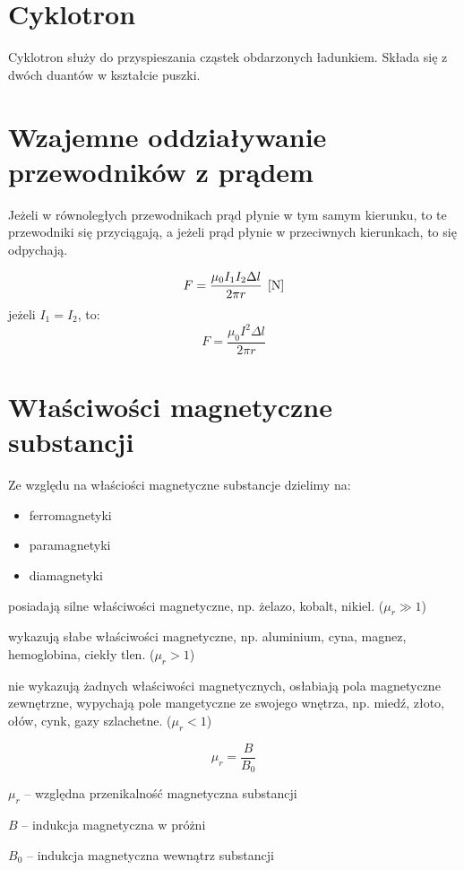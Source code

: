   \section{Cyklotron}
    Cyklotron służy do przyspieszania cząstek obdarzonych ładunkiem. Składa się z dwóch duantów w kształcie puszki.

  \section{Wzajemne oddziaływanie przewodników z prądem}
    Jeżeli w równoległych przewodnikach prąd płynie w tym samym kierunku, to te przewodniki się przyciągają, a jeżeli prąd płynie w przeciwnych kierunkach, to się odpychają.
    \begin{center}
      \begin{tikzpicture}
      \end{tikzpicture}
    \end{center}
    \begin{equation*}
      F = \frac{\mu_0I_1I_2\Delta l}{2\pi r} \unit N
    \end{equation*}
    jeżeli $I_1 = I_2$, to:
    \begin{equation*}
      F = \frac{\mu_0I^2\Delta l}{2\pi r}
    \end{equation*}

  \section{Właściwości magnetyczne substancji}
    Ze względu na właściości magnetyczne substancje dzielimy na:
    \begin{itemize}
      \item ferromagnetyki
      \item paramagnetyki
      \item diamagnetyki
    \end{itemize}


     posiadają silne właściwości magnetyczne, np. żelazo, kobalt, nikiel. ($\mu_r \gg 1$)

     wykazują słabe właściwości magnetyczne, np. aluminium, cyna, magnez, hemoglobina, ciekły tlen. ($\mu_r > 1$)

     nie wykazują żadnych właściwości magnetycznych, osłabiają pola magnetyczne zewnętrzne, wypychają pole mangetyczne ze swojego wnętrza, np. miedź, złoto, ołów, cynk, gazy szlachetne. ($\mu_r <1$)

    \begin{equation*}
      \mu_r = \frac{B}{B_0}
    \end{equation*}
    \begin{symbols}
     \item $\mu_r$ -- względna przenikalność magnetyczna substancji
     \item $B$ -- indukcja magnetyczna w próżni
     \item $B_0$  -- indukcja magnetyczna wewnątrz substancji
    \end{symbols}

